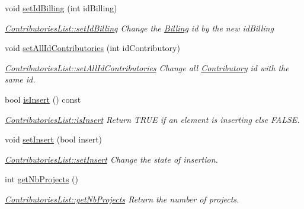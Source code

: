 \begin{DoxyCompactItemize}
void \hyperlink{classModels_1_1ContributoriesList_ad93d74f1b3e0a4ad83bad859812b3547}{set\-Id\-Billing} (int id\-Billing)
\begin{DoxyCompactList}\small\item\em \hyperlink{classModels_1_1ContributoriesList_ad93d74f1b3e0a4ad83bad859812b3547}{Contributories\-List\-::set\-Id\-Billing} Change the \hyperlink{classModels_1_1Billing}{Billing} id by the new {\itshape id\-Billing} \end{DoxyCompactList}\item 
void \hyperlink{classModels_1_1ContributoriesList_a313800788580eb469df125fe8d47c6a6}{set\-All\-Id\-Contributories} (int id\-Contributory)
\begin{DoxyCompactList}\small\item\em \hyperlink{classModels_1_1ContributoriesList_a313800788580eb469df125fe8d47c6a6}{Contributories\-List\-::set\-All\-Id\-Contributories} Change all \hyperlink{classModels_1_1Contributory}{Contributory} id with the same id. \end{DoxyCompactList}\item 
bool \hyperlink{classModels_1_1ContributoriesList_a286c41aee939305541eeadfa64ee17a7}{is\-Insert} () const 
\begin{DoxyCompactList}\small\item\em \hyperlink{classModels_1_1ContributoriesList_a286c41aee939305541eeadfa64ee17a7}{Contributories\-List\-::is\-Insert} Return T\-R\-U\-E if an element is inserting else F\-A\-L\-S\-E. \end{DoxyCompactList}\item 
void \hyperlink{classModels_1_1ContributoriesList_a5d34942a45954d98e53112e2523bee9b}{set\-Insert} (bool insert)
\begin{DoxyCompactList}\small\item\em \hyperlink{classModels_1_1ContributoriesList_a5d34942a45954d98e53112e2523bee9b}{Contributories\-List\-::set\-Insert} Change the state of insertion. \end{DoxyCompactList}\item 
int \hyperlink{classModels_1_1ContributoriesList_a026202989560ff9d462d6104b3788657}{get\-Nb\-Projects} ()
\begin{DoxyCompactList}\small\item\em \hyperlink{classModels_1_1ContributoriesList_a026202989560ff9d462d6104b3788657}{Contributories\-List\-::get\-Nb\-Projects} Return the number of projects. \end{DoxyCompactList}\item 

\end{DoxyCompactItemize}
